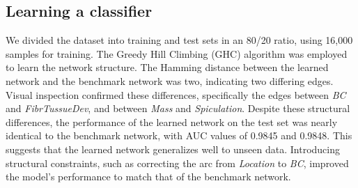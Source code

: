 \documentclass{article}
\begin{document}
\subsection{Learning a classifier}
We divided the dataset into training and test sets in an 80/20 ratio, using 16,000 samples for training.
The Greedy Hill Climbing (GHC) algorithm was employed to learn the network structure. The Hamming distance between the learned network and the benchmark network was two, indicating two differing edges. Visual inspection confirmed these differences, specifically the edges between \textit{BC} and \textit{FibrTussueDev}, and between \textit{Mass} and \textit{Spiculation}.
Despite these structural differences, the performance of the learned network on the test set was nearly identical to the benchmark network, with AUC values of 0.9845 and 0.9848. This suggests that the learned network generalizes well to unseen data. Introducing structural constraints, such as correcting the arc from \textit{Location} to \textit{BC}, improved the model's performance to match that of the benchmark network.






\appendix
\end{document}
